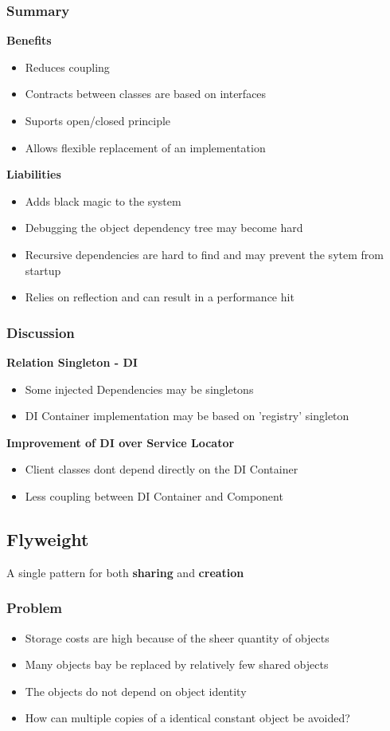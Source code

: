 \subsubsection{Summary}
\textbf{Benefits}
\begin{itemize}
    \item Reduces coupling
    \item Contracts between classes are based on interfaces
    \item Suports open/closed principle
    \item Allows flexible replacement of an implementation
\end{itemize}
\textbf{Liabilities}
\begin{itemize}
    \item Adds black magic to the system
    \item Debugging the object dependency tree may become hard
    \item Recursive dependencies are hard to find and may prevent the sytem from startup
    \item Relies on reflection and can result in a performance hit
\end{itemize}
\subsubsection{Discussion}
\textbf{Relation Singleton - DI}
\begin{itemize}
    \item Some injected Dependencies may be singletons
    \item DI Container implementation may be based on 'registry' singleton
\end{itemize}
\textbf{Improvement of DI over Service Locator}
\begin{itemize}
    \item Client classes dont depend directly on the DI Container
    \item Less coupling between DI Container and Component
\end{itemize}

\subsection{Flyweight}
A single pattern for both \textbf{sharing} and \textbf{creation}
\subsubsection{Problem}
\begin{itemize}
    \item Storage costs are high because of the sheer quantity of objects
    \item Many objects bay be replaced by relatively few shared objects
    \item The objects do not depend on object identity
    \item How can multiple copies of a identical constant object be avoided?
\end{itemize}
